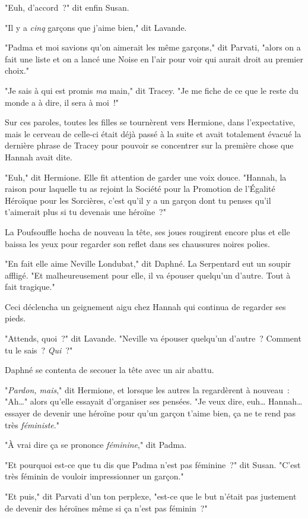 "Euh, d'accord~?" dit enfin Susan.

"Il y a \emph{cinq} garçons que j'aime bien," dit Lavande.

"Padma et moi savions qu'on aimerait les même garçons," dit Parvati, "alors on a fait une liste et on a lancé une Noise en l'air pour voir qui aurait droit au premier choix."

"Je sais à qui est promis \emph{ma} main," dit Tracey. "Je me fiche de ce que le reste du monde a à dire, il sera à moi~!"

Sur ces paroles, toutes les filles se tournèrent vers Hermione, dans l'expectative, mais le cerveau de celle-ci était déjà passé à la suite et avait totalement évacué la dernière phrase de Tracey pour pouvoir se concentrer sur la première chose que Hannah avait dite.

"Euh," dit Hermione. Elle fit attention de garder une voix douce. "Hannah, la raison pour laquelle tu as rejoint la Société pour la Promotion de l'Égalité Héroïque pour les Sorcières, c'est qu'il y a un garçon dont tu penses qu'il t'aimerait plus si tu devenais une héroïne~?"

La Poufsouffle hocha de nouveau la tête, ses joues rougirent encore plus et elle baissa les yeux pour regarder son reflet dans ses chaussures noires polies.

"En fait elle aime Neville Londubat," dit Daphné. La Serpentard eut un soupir affligé. "Et malheureusement pour elle, il va épouser quelqu'un d'autre. Tout à fait tragique."

Ceci déclencha un geignement aigu chez Hannah qui continua de regarder ses pieds.

"Attends, quoi~?" dit Lavande. "Neville va épouser quelqu'un d'autre~? Comment tu le sais~? \emph{Qui}~?"

Daphné se contenta de secouer la tête avec un air abattu.

"\emph{Pardon, mais}," dit Hermione, et lorsque les autres la regardèrent à nouveau~: "Ah…" alors qu'elle essayait d'organiser ses pensées. "Je veux dire, euh… Hannah… essayer de devenir une héroïne pour qu'un garçon t'aime bien, ça ne te rend pas très \emph{féministe}."

"À vrai dire ça se prononce \emph{féminine}," dit Padma.

"Et pourquoi est-ce que tu dis que Padma n'est pas féminine~?" dit Susan. "C'est très féminin de vouloir impressionner un garçon."

"Et puis," dit Parvati d'un ton perplexe, "est-ce que le but n'était pas justement de devenir des héroïnes même si ça n'est pas féminin~?"

